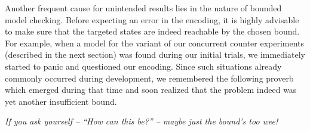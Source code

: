 Another frequent cause for unintended results lies in the nature of bounded model checking.
Before expecting an error in the encoding, it is highly advisable to make sure that the targeted states are indeed reachable by the chosen bound.
For example, when a model for the  variant of our concurrent counter experiments (described in the next section) was found during our initial trials, we immediately started to panic and questioned our encoding.
Since such situations already commonly occurred during development, we remembered the following proverb which emerged during that time and
soon realized that the problem indeed was yet another insufficient bound.
\begin{center}
\itshape
If you ask yourself -- ``How can this be?'' -- maybe just the bound's too wee!
\end{center}
